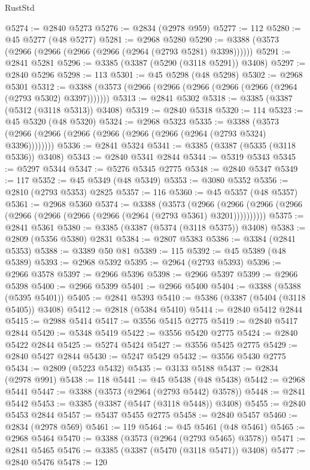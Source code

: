 \begin{lexlean}{RustStd}
\begin{coremodule}
@5274 := @2840 @5273
@5276 := @2834 (@2978 @959)
@5277 := 112
@5280 := @45 @5277 (@48 @5277)
@5281 := @2968 @5280
@5290 := @3388 (@3573 (@2966 (@2966 (@2966 (@2966 (@2964 (@2793 @5281) @3398))))))
@5291 := @2841 @5281
@5296 := @3385 (@3387 (@5290 (@3118 @5291)) @3408)
@5297 := @2840 @5296
@5298 := 113
@5301 := @45 @5298 (@48 @5298)
@5302 := @2968 @5301
@5312 := @3388 (@3573 (@2966 (@2966 (@2966 (@2966 (@2966 (@2964 (@2793 @5302) @3397)))))))
@5313 := @2841 @5302
@5318 := @3385 (@3387 (@5312 (@3118 @5313)) @3408)
@5319 := @2840 @5318
@5320 := 114
@5323 := @45 @5320 (@48 @5320)
@5324 := @2968 @5323
@5335 := @3388 (@3573 (@2966 (@2966 (@2966 (@2966 (@2966 (@2966 (@2964 (@2793 @5324) @3396))))))))
@5336 := @2841 @5324
@5341 := @3385 (@3387 (@5335 (@3118 @5336)) @3408)
@5343 := @2840 @5341 @2844
@5344 := @5319 @5343
@5345 := @5297 @5344
@5347 := @5276 @5345 @2775
@5348 := @2840 @5347
@5349 := 117
@5352 := @45 @5349 (@48 @5349)
@5353 := @3080 @5352
@5356 := @2810 (@2793 @5353) @2825
@5357 := 116
@5360 := @45 @5357 (@48 @5357)
@5361 := @2968 @5360
@5374 := @3388
    (@3573
      (@2966 (@2966 (@2966 (@2966 (@2966 (@2966 (@2966 (@2966 (@2964 (@2793 @5361) @3201))))))))))
@5375 := @2841 @5361
@5380 := @3385 (@3387 (@5374 (@3118 @5375)) @3408)
@5383 := @2809 (@5356 @5380) @2831
@5384 := @2807 @5383
@5386 := @3384 (@2841 @5353)
@5388 := @3389 @50 @81
@5389 := 115
@5392 := @45 @5389 (@48 @5389)
@5393 := @2968 @5392
@5395 := @2964 (@2793 @5393)
@5396 := @2966 @3578
@5397 := @2966 @5396
@5398 := @2966 @5397
@5399 := @2966 @5398
@5400 := @2966 @5399
@5401 := @2966 @5400
@5404 := @3388 (@5388 (@5395 @5401))
@5405 := @2841 @5393
@5410 := @5386 (@3387 (@5404 (@3118 @5405)) @3408)
@5412 := @2818 (@5384 @5410)
@5414 := @2840 @5412 @2844
@5415 := @2988 @5414
@5417 := @3556 @5415 @2775
@5419 := @2840 @5417 @2844
@5420 := @5348 @5419
@5422 := @3556 @5420 @2775
@5424 := @2840 @5422 @2844
@5425 := @5274 @5424
@5427 := @3556 @5425 @2775
@5429 := @2840 @5427 @2844
@5430 := @5247 @5429
@5432 := @3556 @5430 @2775
@5434 := @2809 (@5223 @5432)
@5435 := @3133 @5188
@5437 := @2834 (@2978 @991)
@5438 := 118
@5441 := @45 @5438 (@48 @5438)
@5442 := @2968 @5441
@5447 := @3388 (@3573 (@2964 (@2793 @5442) @3578))
@5448 := @2841 @5442
@5453 := @3385 (@3387 (@5447 (@3118 @5448)) @3408)
@5455 := @2840 @5453 @2844
@5457 := @5437 @5455 @2775
@5458 := @2840 @5457
@5460 := @2834 (@2978 @569)
@5461 := 119
@5464 := @45 @5461 (@48 @5461)
@5465 := @2968 @5464
@5470 := @3388 (@3573 (@2964 (@2793 @5465) @3578))
@5471 := @2841 @5465
@5476 := @3385 (@3387 (@5470 (@3118 @5471)) @3408)
@5477 := @2840 @5476
@5478 := 120

\end{coremodule}
\end{lexlean}
